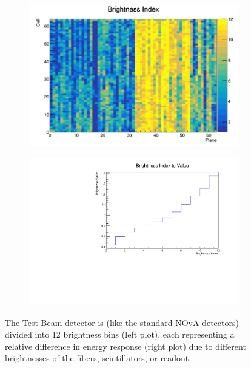 \documentclass[12pt,a4paper]{article}
\begin{document}
\begin{figure}[hbtp]
\centering
\begin{subfigure}[b]{0.495\textwidth}
\centering
\includegraphics[width=\textwidth]{Plots/BrightnessIndex.png}
\end{subfigure}
\begin{subfigure}[b]{0.495\textwidth}
\centering
\includegraphics[width=\textwidth]{Plots/BrightnessIndexToValue.pdf}
\end{subfigure}
\caption{The Test Beam detector is (like the standard NOvA detectors) divided into 12 brightness bins (left plot), each representing a relative difference in energy response (right plot) due to different brightnesses of the fibers, scintillators, or readout.}
\end{figure}
\end{document}
